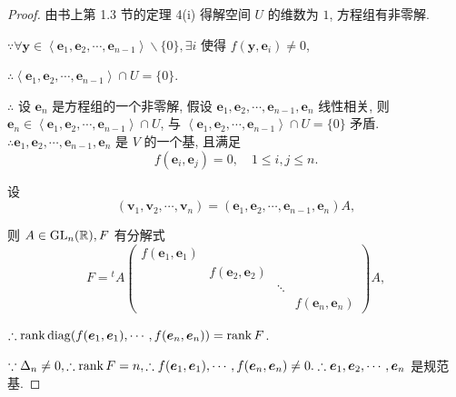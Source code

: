 \documentclass[color=black,device=normal,lang=cn,mode=geye]{elegantnote}
\begin{document}
\begin{proof}
    由书上第 1.3 节的定理 4(i) 得解空间 $U$ 的维数为 $1$, 方程组有非零解.

    $\because\forall\boldsymbol{y}\in\left<\boldsymbol{e}_1,\boldsymbol{e}_2,\cdots,\boldsymbol{e}_{n-1}\right>\backslash\{0\},\exists i$ 使得 $f(\boldsymbol{y},\boldsymbol{e}_i)\neq0$,
    
    $\therefore\left<\boldsymbol{e}_1,\boldsymbol{e}_2,\cdots,\boldsymbol{e}_{n-1}\right>\cap U=\{0\}$.

    $\therefore$ 设 $\boldsymbol{e}_n$ 是方程组的一个非零解, 假设 $\boldsymbol{e}_1,\boldsymbol{e}_2,\cdots,\boldsymbol{e}_{n-1},\boldsymbol{e}_n$ 线性相关, 则 $\boldsymbol{e}_n\in\left<\boldsymbol{e}_1,\boldsymbol{e}_2,\cdots,\boldsymbol{e}_{n-1}\right>\cap U$, 与 $\left<\boldsymbol{e}_1,\boldsymbol{e}_2,\cdots,\boldsymbol{e}_{n-1}\right>\cap U=\{0\}$ 矛盾. $\therefore\boldsymbol{e}_1,\boldsymbol{e}_2,\cdots,\boldsymbol{e}_{n-1},\boldsymbol{e}_n$ 是 $V$ 的一个基, 且满足
    \[f(\boldsymbol{e}_i,\boldsymbol{e}_j)=0,\quad1\leq i,j\leq n.\]
    
    设
    \[(\boldsymbol{v}_1,\boldsymbol{v}_2,\cdots,\boldsymbol{v}_n)=(\boldsymbol{e}_1,\boldsymbol{e}_2,\cdots,\boldsymbol{e}_{n-1},\boldsymbol{e}_n)A,\]

    则 $A\in\operatorname{GL} _n(\mathbb{R}),F$ 有分解式
    \begin{equation}\label{eq3.3}
        F={}^tA\begin{pmatrix}
            f(\boldsymbol{e}_1,\boldsymbol{e}_1) \\
            & f(\boldsymbol{e}_2,\boldsymbol{e}_2) \\
            && \ddots \\
            &&& f(\boldsymbol{e}_n,\boldsymbol{e}_n)
        \end{pmatrix}A,
    \end{equation}

    $\therefore\operatorname{rank} \operatorname{diag} (f(\boldsymbol{e}_1,\boldsymbol{e}_1),\cdots,f(\boldsymbol{e}_n,\boldsymbol{e}_n))=\operatorname{rank} F$.

    $\because\Delta_n\neq0,\therefore\operatorname{rank} F=n,\therefore f(\boldsymbol{e}_1,\boldsymbol{e}_1),\cdots,f(\boldsymbol{e}_n,\boldsymbol{e}_n)\neq0.\therefore\boldsymbol{e}_1,\boldsymbol{e}_2,\cdots,\boldsymbol{e}_n$ 是规范基.


\end{proof}
\end{document}
